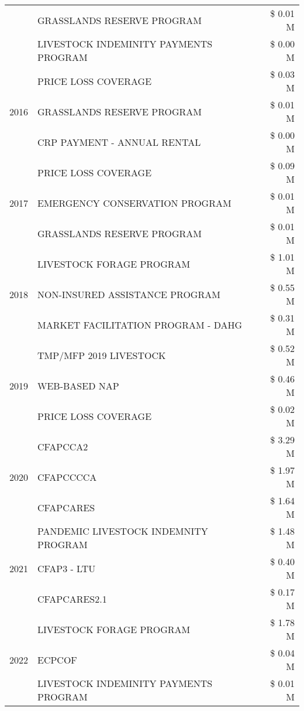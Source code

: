 \begin{tabular}{llr}
 & GRASSLANDS RESERVE PROGRAM & \$ 0.01 M \\
 & LIVESTOCK INDEMINITY PAYMENTS PROGRAM & \$ 0.00 M \\
\cline{1-3}
\multirow[t]{3}{*}{2016} & PRICE LOSS COVERAGE & \$ 0.03 M \\
 & GRASSLANDS RESERVE PROGRAM & \$ 0.01 M \\
 & CRP PAYMENT - ANNUAL RENTAL & \$ 0.00 M \\
\cline{1-3}
\multirow[t]{3}{*}{2017} & PRICE LOSS COVERAGE & \$ 0.09 M \\
 & EMERGENCY CONSERVATION PROGRAM & \$ 0.01 M \\
 & GRASSLANDS RESERVE PROGRAM & \$ 0.01 M \\
\cline{1-3}
\multirow[t]{3}{*}{2018} & LIVESTOCK FORAGE PROGRAM & \$ 1.01 M \\
 & NON-INSURED ASSISTANCE PROGRAM & \$ 0.55 M \\
 & MARKET FACILITATION PROGRAM - DAHG & \$ 0.31 M \\
\cline{1-3}
\multirow[t]{3}{*}{2019} & TMP/MFP 2019 LIVESTOCK & \$ 0.52 M \\
 & WEB-BASED NAP & \$ 0.46 M \\
 & PRICE LOSS COVERAGE & \$ 0.02 M \\
\cline{1-3}
\multirow[t]{3}{*}{2020} & CFAPCCA2 & \$ 3.29 M \\
 & CFAPCCCCA & \$ 1.97 M \\
 & CFAPCARES & \$ 1.64 M \\
\cline{1-3}
\multirow[t]{3}{*}{2021} & PANDEMIC LIVESTOCK INDEMNITY PROGRAM & \$ 1.48 M \\
 & CFAP3 - LTU & \$ 0.40 M \\
 & CFAPCARES2.1 & \$ 0.17 M \\
\cline{1-3}
\multirow[t]{3}{*}{2022} & LIVESTOCK FORAGE PROGRAM & \$ 1.78 M \\
 & ECPCOF & \$ 0.04 M \\
 & LIVESTOCK INDEMINITY PAYMENTS PROGRAM & \$ 0.01 M \\
\cline{1-3}
\bottomrule
\end{tabular}
